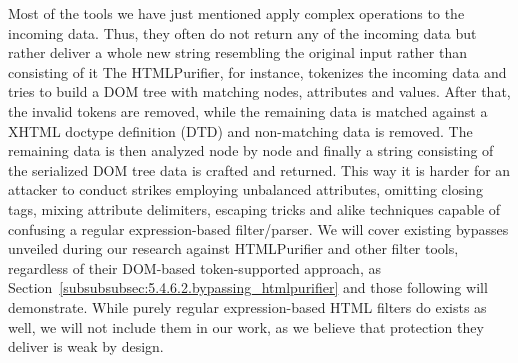     Most of the tools we have just mentioned apply complex operations to the incoming data. Thus, they often do not return any of the incoming data but rather deliver a whole new string resembling the original input rather than consisting of it%
    The HTMLPurifier, for instance, tokenizes the incoming data and tries to build a DOM tree with matching nodes, attributes and values. After that, the invalid tokens are removed, while the remaining data is matched against a XHTML doctype definition (DTD) and  non-matching data is removed. The remaining data is then analyzed node by node and finally a string consisting of the serialized DOM tree data is crafted and returned. This way it is harder for an attacker to conduct strikes employing unbalanced attributes, omitting closing tags, mixing attribute delimiters, escaping tricks and alike techniques capable of confusing a regular expression-based filter/parser. We will cover existing bypasses unveiled during our research against HTMLPurifier and other filter tools, regardless of their DOM-based token-supported approach, as Section~\ref{subsubsubsec:5.4.6.2.bypassing_htmlpurifier} and those following will demonstrate. While purely regular expression-based HTML filters do exists as well, we will not 
include them in our work, as we believe that protection they deliver is weak by design. %

